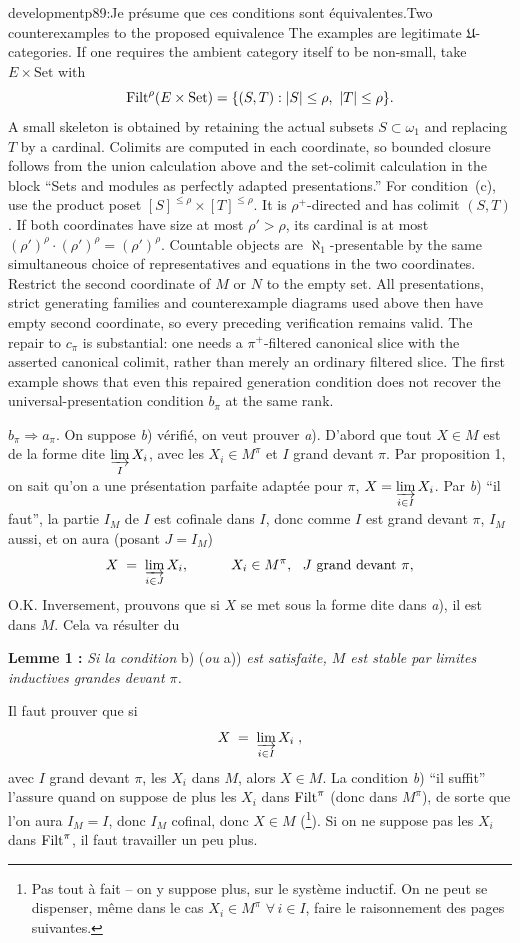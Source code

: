 \begin{dcomment}{development}{p89:Je présume que ces conditions sont équivalentes.}{Two counterexamples to the proposed equivalence}
The examples are legitimate $\mathfrak U$-categories. If one requires the ambient category itself to be non-small, take $E\times\mathrm{Set}$ with
\[
 \mathrm{Filt}^\rho(E\times\mathrm{Set})=
 \{(S,T): |S|\leq\rho,\ |T|\leq\rho\}.
\]
A small skeleton is obtained by retaining the actual subsets $S\subset\omega_1$ and replacing $T$ by a cardinal. Colimits are computed in each coordinate, so bounded closure follows from the union calculation above and the set-colimit calculation in the block ``Sets and modules as perfectly adapted presentations.'' For condition~(c), use the product poset $[S]^{\leq\rho}\times[T]^{\leq\rho}$. It is $\rho^+$-directed and has colimit $(S,T)$. If both coordinates have size at most $\rho'>\rho$, its cardinal is at most $(\rho')^\rho\cdot(\rho')^\rho=(\rho')^\rho$. Countable objects are $\aleph_1$-presentable by the same simultaneous choice of representatives and equations in the two coordinates. Restrict the second coordinate of $M$ or $N$ to the empty set. All presentations, strict generating families and counterexample diagrams used above then have empty second coordinate, so every preceding verification remains valid. The repair to $c_\pi$ is substantial: one needs a $\pi^+$-filtered canonical slice with the asserted canonical colimit, rather than merely an ordinary filtered slice. The first example shows that even this repaired generation condition does not recover the universal-presentation condition $b_\pi$ at the same rank.
\end{dcomment}


$b_\pi\Longrightarrow a_\pi$. On suppose \textit{b}) vérifié, on veut prouver \textit{a}). D'abord que tout $X\in M$ est de la forme dite $\varinjlim\limits_{I} X_i$, avec les $X_i\in M^\pi$ et $I$ grand devant $\pi$. Par proposition 1, on sait qu'on a une présentation parfaite adaptée pour $\pi$, $X=\varinjlim\limits_{i\in I} X_i$. Par \textit{b}) “il faut”, la partie $I_M$ de $I$ est cofinale dans $I$, donc comme $I$ est grand devant $\pi$, $I_M$ aussi, et on aura (posant $J=I_M$)
\[
X \;=\; \varinjlim_{i\in J} X_i, \qquad\quad X_i\in M^\pi,\ \ J \text{ grand devant } \pi,
\]
O.K. Inversement, prouvons que si $X$ se met sous la forme dite dans \textit{a}), il est dans $M$. Cela va résulter du

\textbf{Lemme 1 :} \textit{Si la condition} b) (\textit{ou} a)) \textit{est satisfaite, $M$ est stable par limites inductives grandes devant $\pi$.}

Il faut prouver que si
\[
X \;=\; \varinjlim_{i\in I} X_i \;,
\]
avec $I$ grand devant $\pi$, les $X_i$ dans $M$, alors $X\in M$. La condition \textit{b}) “il suffit” l'assure quand on suppose de plus les $X_i$ dans $\mathrm{Filt}^\pi$ (donc dans $M^\pi$), de sorte que l'on aura $I_M=I$, donc $I_M$ cofinal, donc $X\in M$ (\footnote[42]{Pas tout à fait – on y suppose plus, sur le système inductif. On ne peut se dispenser, même dans le cas $X_i\in M^\pi$ $\forall\, i\in I$, faire le raisonnement des pages suivantes.}). Si on ne suppose pas les $X_i$ dans $\mathrm{Filt}^\pi$, il faut travailler un peu plus.

